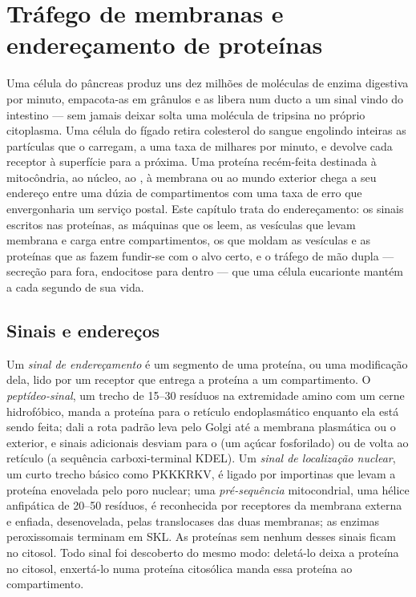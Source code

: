 \chapter{Tráfego de membranas e endereçamento de proteínas}\label{ch:b3:membrane-traffic}

Uma célula do pâncreas produz uns dez milhões de moléculas de enzima
digestiva por minuto, empacota-as em grânulos e as libera num ducto a
um sinal vindo do intestino --- sem jamais deixar solta uma molécula de
tripsina no próprio citoplasma. Uma célula do fígado retira colesterol
do sangue engolindo inteiras as partículas que o carregam, a uma taxa
de milhares por minuto, e devolve cada receptor à superfície para a
próxima. Uma proteína recém-feita destinada à mitocôndria, ao núcleo,
ao , à membrana ou ao mundo exterior chega a seu endereço
entre uma dúzia de compartimentos com uma taxa de erro que
envergonharia um serviço postal. Este capítulo trata do endereçamento:
os sinais escritos nas proteínas, as máquinas que os leem, as vesículas
que levam membrana e carga entre compartimentos, os  que
moldam as vesículas e as proteínas que as fazem fundir-se com o alvo
certo, e o tráfego de mão dupla --- secreção para fora, endocitose para
dentro --- que uma célula eucarionte mantém a cada segundo de sua vida.

\section{Sinais e endereços}

\begin{definition}\label{def:b3:membrane-traffic:signals}
Um \emph{sinal de endereçamento} é um segmento de uma proteína, ou uma
modificação dela, lido por um receptor que entrega a proteína a um
compartimento. O \emph{peptídeo-sinal}, um trecho de
\numrange{15}{30} resíduos na extremidade amino com um cerne
hidrofóbico, manda a proteína para o retículo endoplasmático enquanto
ela está sendo feita; dali a rota padrão leva pelo Golgi até a membrana
plasmática ou o exterior, e sinais adicionais desviam para o 
(um açúcar fosforilado) ou de volta ao retículo (a sequência
carboxi-terminal KDEL). Um \emph{sinal de localização nuclear}, um
curto trecho básico como PKKKRKV, é ligado por importinas que levam a
proteína enovelada pelo poro nuclear; uma \emph{pré-sequência}
mitocondrial, uma hélice anfipática de \numrange{20}{50} resíduos, é
reconhecida por receptores da membrana externa e enfiada, desenovelada,
pelas translocases das duas membranas; as enzimas peroxissomais
terminam em SKL. As proteínas sem nenhum desses sinais ficam no
citosol. Todo sinal foi descoberto do mesmo modo: deletá-lo deixa a
proteína no citosol, enxertá-lo numa proteína citosólica manda essa
proteína ao compartimento.
\end{definition}

